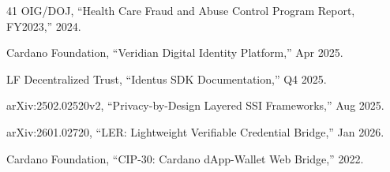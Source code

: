 \documentclass[conference,10pt]{IEEEtran}
\begin{document}
\begin{thebibliography}{41}
OIG/DOJ, ``Health Care Fraud and Abuse Control Program Report, FY2023,'' 2024.

Cardano Foundation, ``Veridian Digital Identity Platform,'' Apr 2025.

LF Decentralized Trust, ``Identus SDK Documentation,'' Q4 2025.

arXiv:2502.02520v2, ``Privacy-by-Design Layered SSI Frameworks,'' Aug 2025.

arXiv:2601.02720, ``LER: Lightweight Verifiable Credential Bridge,'' Jan 2026.

Cardano Foundation, ``CIP-30: Cardano dApp-Wallet Web Bridge,'' 2022.

\end{thebibliography}

\balance
\end{document}
